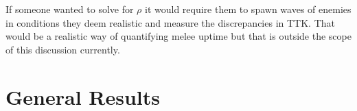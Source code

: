 \documentclass{article}
\begin{document}
If someone wanted to solve for $\rho$ it would require them to spawn waves of enemies in conditions they deem realistic and measure the discrepancies in TTK. That would be a realistic way of quantifying melee uptime but that is outside the scope of this discussion currently.

\section*{General Results}

\section*{}
\end{document}
